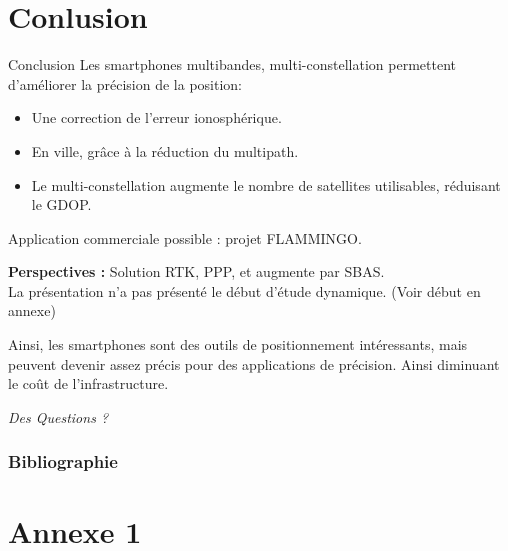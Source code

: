 \documentclass[xcolor=dvipsnames,envcountsect]{beamer}
\makeatletter
\let\beamer@writeslidentry@miniframeson=\beamer@writeslidentry
\def\beamer@writeslidentry@miniframesoff{%
  \expandafter\beamer@ifempty\expandafter{\beamer@framestartpage}{}%
  {%
    \clearpage\beamer@notesactions%
  }
}
\newcommand*{\miniframeson}{\let\beamer@writeslidentry=\beamer@writeslidentry@miniframeson}
\newcommand*{\miniframesoff}{\let\beamer@writeslidentry=\beamer@writeslidentry@miniframesoff}
\makeatother
\begin{document}
\section{Conlusion}
\begin{frame}{Conclusion}
	Les smartphones multibandes, multi-constellation permettent d'améliorer la précision de la position:
	\begin{itemize}
		\item Une correction de l'erreur ionosphérique.
		\item En ville, grâce à la réduction du multipath.
		\item Le multi-constellation augmente le nombre de satellites utilisables, réduisant le GDOP.
	\end{itemize}
	Application commerciale possible : projet FLAMMINGO.
	\newline

	\textbf{Perspectives :} Solution RTK, PPP, et augmente par SBAS.\\
	La présentation n'a pas présenté le début d'étude dynamique. {\small (Voir début en annexe)}
	\newline

	Ainsi, les smartphones sont des outils de positionnement intéressants, mais peuvent devenir assez précis pour des applications de précision.
	Ainsi diminuant le coût de l'infrastructure.
\end{frame}

\miniframesoff
\begin{frame}
	\centering
	\begin{block}
		\scshape
			\begin{center}
				\Huge\emph{Des Questions ?}
			\end{center}
	\end{block}
\end{frame}

\miniframeson
\appendix
\begin{frame}[allowframebreaks]
	\frametitle{Bibliographie}
	\printbibliography
\end{frame}

\section{Annexe 1}
	
\end{document}
